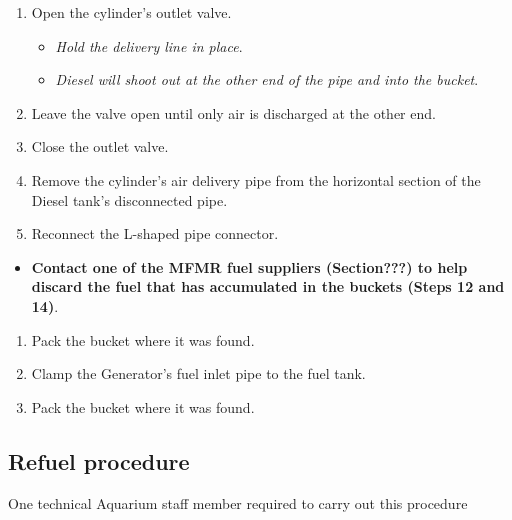 \documentclass[
  letterpaper,
  DIV=11,
  numbers=noendperiod]{scrreprt}
\providecommand{\tightlist}{%
  \setlength{\itemsep}{0pt}\setlength{\parskip}{0pt}}\usepackage{longtable,booktabs,array}
\begin{document}
\begin{enumerate}
\def\labelenumi{\arabic{enumi}.}
\setcounter{enumi}{6}
\tightlist
\item
  Open the cylinder's outlet valve.

  \begin{itemize}
  \tightlist
  \item
    \emph{Hold the delivery line in place}.
  \item
    \emph{Diesel will shoot out at the other end of the pipe and into
    the bucket}.
  \end{itemize}
\item
  Leave the valve open until only air is discharged at the other end.
\item
  Close the outlet valve.
\item
  Remove the cylinder's air delivery pipe from the horizontal section of
  the Diesel tank's disconnected pipe.
\item
  Reconnect the L-shaped pipe connector.
\end{enumerate}

\begin{itemize}
\tightlist
\item
  \textbf{Contact one of the MFMR fuel suppliers (Section???) to help
  discard the fuel that has accumulated in the buckets (Steps 12 and
  14)}.
\end{itemize}

\begin{enumerate}
\def\labelenumi{\arabic{enumi}.}
\setcounter{enumi}{11}
\tightlist
\item
  Pack the bucket where it was found.
\item
  Clamp the Generator's fuel inlet pipe to the fuel tank.
\item
  Pack the bucket where it was found.
\end{enumerate}

\hypertarget{refuel-procedure}{%
\subsection{Refuel procedure}\label{refuel-procedure}}

{One technical Aquarium staff member required to carry out this
procedure}
\end{document}
